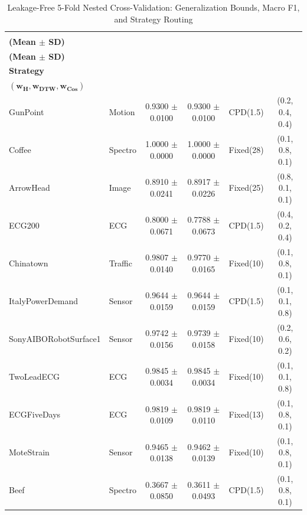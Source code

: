 \documentclass[conference]{IEEEtran}
\newcommand{\ieeetableformat}{%
  \footnotesize
  \setlength{\tabcolsep}{3pt}%
  \renewcommand{\arraystretch}{1.05}%
}
\begin{document}
\begin{table}[!t]
\caption{Leakage-Free 5-Fold Nested Cross-Validation: Generalization Bounds, Macro F1, and Strategy Routing}
\label{tab:nested_cv_generalization}
\centering
\ieeetableformat
\setlength{\tabcolsep}{2pt}
\begin{tabular}{|>{\raggedright\arraybackslash}p{3.6cm}|>{\raggedright\arraybackslash}p{1.6cm}|c|c|c|c|}
\hline
\multicolumn{1}{|c|}{\textbf{Dataset}} & \multicolumn{1}{c|}{\textbf{Domain}} & \shortstack{\textbf{Nested CV Acc}\\\textbf{(Mean $\pm$ SD)}} & \shortstack{\textbf{Nested CV F1}\\\textbf{(Mean $\pm$ SD)}} & \shortstack{\textbf{Optimal}\\\textbf{Strategy}} & \shortstack{\textbf{Tuned Weights}\\$\boldsymbol{(w_H, w_{DTW}, w_{Cos})}$} \\ \hline
GunPoint               & Motion    & 0.9300 $\pm$ 0.0100   & 0.9300 $\pm$ 0.0100   & CPD(1.5)    & (0.2, 0.4, 0.4) \\
Coffee                 & Spectro   & 1.0000 $\pm$ 0.0000   & 1.0000 $\pm$ 0.0000   & Fixed(28)   & (0.1, 0.8, 0.1) \\
ArrowHead              & Image     & 0.8910 $\pm$ 0.0241   & 0.8917 $\pm$ 0.0226   & Fixed(25)   & (0.8, 0.1, 0.1) \\
ECG200                 & ECG       & 0.8000 $\pm$ 0.0671   & 0.7788 $\pm$ 0.0673   & CPD(1.5)    & (0.4, 0.2, 0.4) \\
Chinatown              & Traffic   & 0.9807 $\pm$ 0.0140   & 0.9770 $\pm$ 0.0165   & Fixed(10)   & (0.1, 0.8, 0.1) \\
ItalyPowerDemand       & Sensor    & 0.9644 $\pm$ 0.0159   & 0.9644 $\pm$ 0.0159   & CPD(1.5)    & (0.1, 0.1, 0.8) \\
SonyAIBORobotSurface1  & Sensor    & 0.9742 $\pm$ 0.0156   & 0.9739 $\pm$ 0.0158   & Fixed(10)   & (0.2, 0.6, 0.2) \\
TwoLeadECG             & ECG       & 0.9845 $\pm$ 0.0034   & 0.9845 $\pm$ 0.0034   & Fixed(10)   & (0.1, 0.1, 0.8) \\
ECGFiveDays            & ECG       & 0.9819 $\pm$ 0.0109   & 0.9819 $\pm$ 0.0110   & Fixed(13)   & (0.1, 0.8, 0.1) \\
MoteStrain             & Sensor    & 0.9465 $\pm$ 0.0138   & 0.9462 $\pm$ 0.0139   & Fixed(10)   & (0.1, 0.8, 0.1) \\
Beef                   & Spectro   & 0.3667 $\pm$ 0.0850   & 0.3611 $\pm$ 0.0493   & CPD(1.5)    & (0.1, 0.8, 0.1) \\

\end{tabular}
\end{table}
\end{document}
